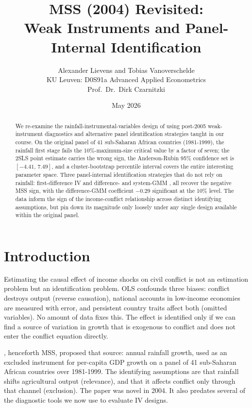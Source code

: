 \documentclass[11pt,a4paper]{article}
\title{\textbf{MSS (2004) Revisited:\\
       Weak Instruments and Panel-Internal Identification}}
\author{Alexander Lievens and Tobias Vanoverschelde\\
\small KU Leuven: D0S91a Advanced Applied Econometrics\\
\small Prof.\ Dr.\ Dirk Czarnitzki}
\date{May 2026}
\begin{document}
\maketitle

\begin{abstract}
\noindent
We re-examine the rainfall-instrumental-variables design of
\citet{MSS2004} using post-2005 weak-instrument diagnostics and
alternative panel identification strategies taught in our course. On
the original panel of 41 sub-Saharan African countries (1981-1999),
the rainfall first stage fails the \citet{StockYogo2005}
10\%-maximum-size critical value by a factor of seven; the 2SLS point
estimate carries the wrong sign, the Anderson-Rubin 95\%
confidence set is $[-4.41,\,7.49]$, and a cluster-bootstrap percentile
interval covers the entire interesting parameter space. Three
panel-internal identification strategies that do not rely on
rainfall: first-difference IV \citep{AndersonHsiao1981} and
difference- and system-GMM \citep{ArellanoBond1991,BlundellBond1998},
all recover the negative MSS sign, with the difference-GMM
coefficient $-0.29$ significant at the 10\% level. The data inform
the sign of the income-conflict relationship across distinct
identifying assumptions, but pin down its magnitude only loosely under
any single design available within the original panel.
\end{abstract}

\section{Introduction}\label{sec:intro}
Estimating the causal effect of income shocks on civil conflict is
not an estimation problem but an identification problem. OLS confounds
three biases: conflict destroys output (reverse causation), national
accounts in low-income economies are measured with error, and
persistent country traits affect both (omitted variables). No amount
of data fixes this. The effect is identified only if we can find a
source of variation in growth that is exogenous to conflict and does
not enter the conflict equation directly.

\citet{MSS2004}, henceforth MSS, proposed that source: annual rainfall
growth, used as an excluded instrument for per-capita GDP growth on a
panel of 41 sub-Saharan African countries over 1981-1999. The
identifying assumptions are that rainfall shifts agricultural output
(relevance), and that it affects conflict only through that channel
(exclusion). The paper was novel in 2004. It also predates several of
the diagnostic tools we now use to evaluate IV designs.
\end{document}

